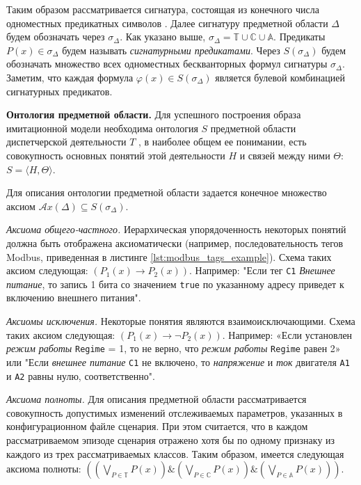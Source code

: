 Таким образом рассматривается сигнатура, состоящая из конечного числа одноместных предикатных символов \cite[стр. 17]{book:math_logic:guz}.
Далее сигнатуру предметной области $\Delta$ будем обозначать через $\sigma_\Delta$.
Как указано выше, $\sigma_\Delta = \mathbb{T} \cup \mathbb{C} \cup \mathbb{A}$.
Предикаты $P(x) \in \sigma_\Delta$ будем называть \textit{сигнатурными предикатами}.
Через $S(\sigma_\Delta)$ будем обозначать множество всех одноместных бескванторных формул сигнатуры $\sigma_\Delta$.
Заметим, что каждая формула $\varphi(x) \in S(\sigma_\Delta)$ является булевой комбинацией сигнатурных предикатов.


\textbf{Онтология предметной области.}
Для успешного построения образа имитационной модели необходима онтология $S$ предметной области
диспетчерской деятельности $T$ \cite{journal:vestnik_spbgu:ivakin, journal:vestnik_vgtu:shapkin},
в наиболее общем ее понимании, есть совокупность основных понятий этой деятельности $H$ и связей между ними $\Theta$:
$S=\langle H, \Theta\rangle$. 

Для описания онтологии предметной области задается конечное множество аксиом $\mathcal{A}x(\Delta) \subseteq S(\sigma_\Delta)$.
  
\textit{Аксиома общего-частного.}
Иерархическая упорядоченность некоторых понятий должна быть отображена аксиоматически (например, последовательность тегов Modbus, приведенная в листинге \ref{lst:modbus_tags_example}).
Схема таких аксиом следующая: $\left(P_1(x) \to P_2(x) \right)$.
Например: "Если тег \texttt{C1} \textit{Внешнее питание}, то запись 1 бита со значением \texttt{true} по указанному адресу приведет к включению внешнего питания".

\textit{Аксиомы исключения.}
Некоторые понятия являются взаимоисключающими. Схема таких аксиом следующая:
$\left(P_1(x) \to \lnot P_2(x) \right)$.
Например: «Если установлен \textit{режим работы} \texttt{Regime} = 1, то не верно, что \textit{режим работы} \texttt{Regime} равен 2»
или
"Если \textit{внешнее питание} \texttt{C1} не включено, то \textit{напряжение} и \textit{ток} двигателя \texttt{A1} и \texttt{A2} равны нулю, соответственно".

\textit{Аксиома полноты.}
Для описания предметной области рассматривается совокупность допустимых изменений отслеживаемых параметров,
указанных в конфигурационном файле сценария. При этом считается, что в каждом рассматриваемом эпизоде сценария
отражено хотя бы по одному признаку из каждого из трех рассматриваемых классов.
Таким образом, имеется следующая аксиома полноты:
$\left( \left(\bigvee_{P\in\mathbb{T}}P(x)\right) \& \left(\bigvee_{P\in\mathbb{C}}P(x)\right) \& \left(\bigvee_{P\in\mathbb{A}}P(x)\right) \right)$.


